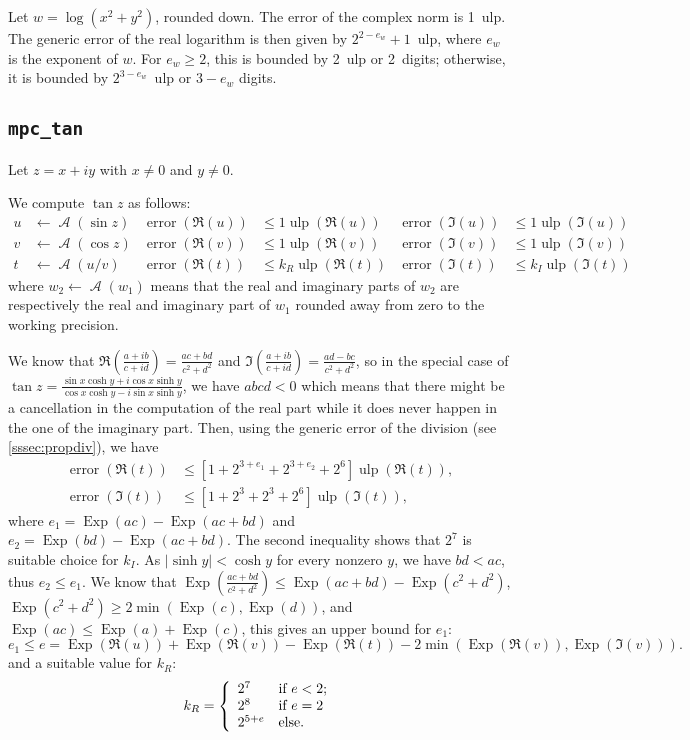 \documentclass [11pt]{article}
\newcommand {\ulp}[1]{#1~ulp}
\newcommand {\Ulp}{{\operatorname {ulp}}}
\DeclareMathOperator{\Exp}{\operatorname {Exp}}
\newcommand{\error}{\operatorname {error}}
\DeclareMathOperator{\A}{\mathcal A}
\renewcommand {\leq}{\leqslant}
\renewcommand {\geq}{\geqslant}
\begin{document}
Let $w = \log (x^2 + y^2)$, rounded down. The error of the complex norm is \ulp{1}. The generic error of the real logarithm is then given by \ulp{$2^{2 - e_w} + 1$}, where $e_w$ is the exponent of $w$. For $e_w \geq 2$, this is bounded by \ulp{2} or 2~digits; otherwise, it is bounded by \ulp{$2^{3 - e_w}$} or $3 - e_w$ digits.

\subsection {\texttt {mpc\_tan}}

Let $z = x + i y$ with $x \neq 0$ and $y \neq 0$.

We compute $\tan z$ as follows:
\begin{align*}
u &\leftarrow \A(\sin z) &\error(\Re(u)) &\leq 1 \Ulp(\Re(u))
&\error(\Im(u)) &\leq 1 \Ulp(\Im(u))
\\
v &\leftarrow \A(\cos z) &\error(\Re(v)) &\leq 1 \Ulp(\Re(v))
&\error(\Im(v)) &\leq 1 \Ulp(\Im(v))
\\
t &\leftarrow \A(u/v) &\error(\Re(t)) &\leq k_R \Ulp(\Re(t))
&\error(\Im(t)) &\leq k_I \Ulp(\Im(t))
\end{align*}
where $w_2 \leftarrow \A(w_1)$ means that the real and imaginary parts of
$w_2$ are respectively the real and imaginary part of $w_1$ rounded away from
zero to the working precision.

We know that $\Re(\frac{a+i b}{c+i d})=\frac{a c +b d}{c^2 + d^2}$ and
$\Im(\frac{a+i b}{c+i d})=\frac{a d -b c}{c^2 + d^2}$, so in the special case
of $\tan z=\frac{\sin x\cosh y+i\cos x\sinh y}{\cos x\cosh y-i\sin x\sinh y}$,
we have $abcd < 0$ which means that there might be a cancellation in the
computation of the real part while it does never happen in the one of the
imaginary part.  Then, using the generic error of the division (see
\ref{sssec:propdiv}), we have
\begin{align*}
\error(\Re(t)) &\leq [1+2^{3+e_1}+2^{3+e_2}+2^6] \Ulp(\Re(t)),
\\
\error(\Im(t)) &\leq [1+2^3+2^3+2^6] \Ulp(\Im(t)),
\end{align*}
where $e_1=\Exp(a c) -\Exp(a c+b d)$ and $e_2=\Exp(b d) -\Exp(a c+b d)$.  The
second inequality shows that $2^7$ is suitable choice for $k_I$. As $|\sinh
y|<\cosh y$ for every nonzero $y$, we have $bd<ac$, thus $e_2\leq e_1$. We
know that $\Exp(\frac{a c+b d}{c^2+d^2})\leq \Exp(a c+b d) -\Exp(c^2+d^2)$,
$\Exp(c^2+d^2)\geq2 \min(\Exp(c), \Exp(d))$, and $\Exp(ac) \leq \Exp(a) +
\Exp(c)$, this gives an upper bound for $e_1$:
\[
e_1 \leq e = \Exp(\Re(u)) +\Exp(\Re(v)) -\Exp(\Re(t))
-2 \min(\Exp(\Re(v)), \Exp(\Im(v))).
\]
and a suitable value for $k_R$:
\begin{equation*}
k_R=\left\{
\begin{array}{l l}
  2^7 & \mbox{if $e < 2$;}
  \\
  2^8 & \mbox{if $e = 2$}
  \\
  2^{5 + e} & \mbox{else.}
\end{array}
\right.
\end{equation*}
\end{document}
